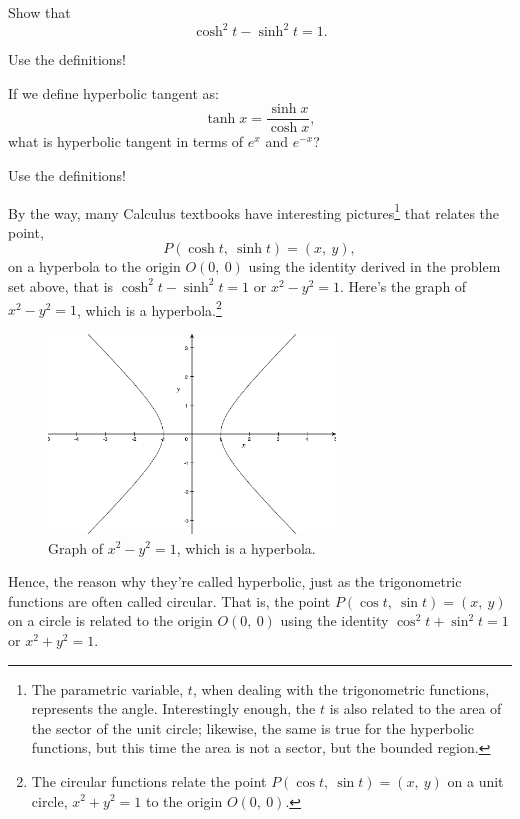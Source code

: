 \documentclass[12pt,addpoints, answers, fleqn]{exam}
\begin{document}
\begin{questions}
\question Show that
\[
\cosh^2 t - \sinh^2 t = 1.
\]

\begin{solution}
Use the definitions!
\end{solution}

\question If we define hyperbolic tangent as:
\[
\tanh x = \frac{\sinh x}{\cosh x},
\]
what is hyperbolic tangent in terms of $e^x$ and $e^{-x}$?


\begin{solution}
Use the definitions!
\end{solution}


\end{questions}




By the way, many Calculus textbooks have interesting pictures\footnote{The parametric variable, $t$, when dealing with the trigonometric functions, represents the angle. Interestingly enough, the $t$ is also related to the area of the sector of the unit circle; likewise, the same is true for the hyperbolic functions, but this time the area is not a sector, but the bounded region.} that relates the point,
\[
P\left( \cosh t, \ \sinh t \right) = \left( x, \ y \right),
\]
on a hyperbola to the origin $O\left( 0, \  0 \right)$ using the identity derived in the problem set above, that is $\cosh^2 t- \sinh^2 t = 1$ or $x^2 - y^2 =1$. Here's the graph of $x^2 - y^2 =1$, which is a hyperbola.\footnote{The circular functions relate the point $P\left( \cos t, \ \sin t \right) = \left( x, \ y \right)$ on a unit circle, $x^2+y^2=1$ to the origin $O\left( 0, \  0 \right)$.
}
\begin{figure}[htbp] %
   \centering
   \includegraphics[width=3in]{./graphics/graph1705.pdf} 
   \caption{Graph of $x^2 - y^2 =1$, which is a hyperbola.}
   \label{fig:graph1705}
\end{figure}



Hence, the reason why they're called hyperbolic, just as the trigonometric functions are often called circular. That is, the point $P\left( \cos t, \ \sin t \right) = \left( x, \ y \right)$ on a circle is related to the origin $O\left( 0, \  0 \right)$ using the identity $\cos^2 t + \sin^2 t = 1$ or $x^2 + y^2 =1$.
\end{document}
